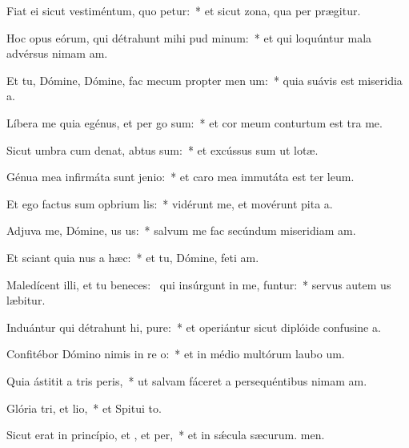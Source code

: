 \item Fiat ei sicut vestiméntum, quo petur:~* et sicut zona, qua per prægitur.
\item Hoc opus eórum, qui détrahunt mihi pud minum:~* et qui loquúntur mala advérsus nimam am.
\item Et tu, Dómine, Dómine, fac mecum propter men um:~* quia suávis est miseridia a.
\item Líbera me quia egénus, et per go sum:~* et cor meum conturtum est tra me.
\item Sicut umbra cum denat, abtus sum:~* et excússus sum ut lotæ.
\item Génua mea infirmáta sunt  jenio:~* et caro mea immutáta est ter leum.
\item Et ego factus sum opbrium lis:~* vidérunt me, et movérunt pita a.
\item Adjuva me, Dómine, us us:~* salvum me fac secúndum miseridiam am.
\item Et sciant quia nus a hæc:~* et tu, Dómine, feti am.
\item Maledícent illi, et tu beneces:~\pscross{} qui insúrgunt in me, funtur:~* servus autem us læbitur.
\item Induántur qui détrahunt hi, pure:~* et operiántur sicut diplóide confusine a.
\item Confitébor Dómino nimis in re o:~* et in médio multórum laubo um.
\item Quia ástitit a tris peris,~* ut salvam fáceret a persequéntibus nimam am.
\item Glória tri, et lio,~* et Spitui to.
\item Sicut erat in princípio, et , et per,~* et in sǽcula sæcurum. men.
